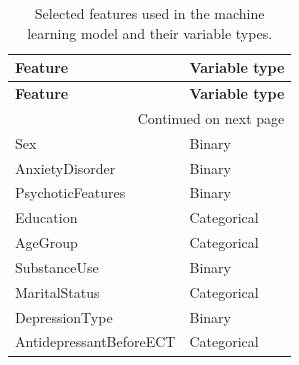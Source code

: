 
\begin{longtable}{ll}
\caption{Selected features used in the machine learning model and their variable types.}
\label{tab:featuretypes}\\
\toprule
\textbf{Feature} & \textbf{Variable type} \\
\midrule
\endfirsthead

\toprule
\textbf{Feature} & \textbf{Variable type} \\
\midrule
\endhead

\midrule
\multicolumn{2}{r}{Continued on next page} \\
\midrule
\endfoot

\bottomrule
\endlastfoot
Sex & Binary \\
AnxietyDisorder & Binary \\
PsychoticFeatures & Binary \\
Education & Categorical \\
AgeGroup & Categorical \\
SubstanceUse & Binary \\
MaritalStatus & Categorical \\
DepressionType & Binary \\
AntidepressantBeforeECT & Categorical \\
\end{longtable}
